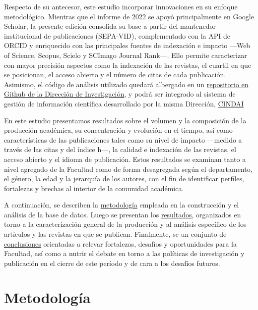 \documentclass[
  a4paper,
  oneside]{scrbook}
\begin{document}
Respecto de su antecesor, este estudio incorporar innovaciones en su
enfoque metodológico. Mientras que el informe de 2022 se apoyó
principalmente en Google Scholar, la presente edición consolida su base
a partir del mantenedor institucional de publicaciones (SEPA-VID),
complementado con la API de ORCID y enriquecido con las principales
fuentes de indexación e impacto ---Web of Science, Scopus, Scielo y
SCImago Journal Rank---. Ello permite caracterizar con mayor precisión
aspectos como la indexación de las revistas, el cuartil en que se
posicionan, el acceso abierto y el número de citas de cada publicación.
Asimismo, el código de análisis utilizado quedará albergado en un
\href{https://github.com/facso-investigacion/publicaciones-facso}{repositorio
en Github de la Dirección de Investigación}, y podrá ser integrado al
sistema de gestión de información científica desarrollado por la misma
Dirección,
\href{https://facso-investigacion.github.io/documentacion-cindai/}{CINDAI}

En este estudio presentamos resultados sobre el volumen y la composición
de la producción académica, su concentración y evolución en el tiempo,
así como características de las publicaciones tales como su nivel de
impacto ---medido a través de las citas y del índice h---, la calidad e
indexación de las revistas, el acceso abierto y el idioma de
publicación. Estos resultados se examinan tanto a nivel agregado de la
Facultad como de forma desagregada según el departamento, el género, la
edad y la jerarquía de los autores, con el fin de identificar perfiles,
fortalezas y brechas al interior de la comunidad académica.

A continuación, se describen la \href{02-metodologia.qmd}{metodología}
empleada en la construcción y el análisis de la base de datos. Luego se
presentan los \href{03-resultados.qmd}{resultados}, organizados en torno
a la caracterización general de la producción y al análisis específico
de los artículos y las revistas en que se publican. Finalmente, se un
conjunto de \href{04-conclusiones.qmd}{conclusiones} orientadas a
relevar fortalezas, desafíos y oportunidades para la Facultad, así como
a nutrir el debate en torno a las políticas de investigación y
publicación en el cierre de este período y de cara a los desafíos
futuros.


\chapter{Metodología}\label{sec-methods}
\end{document}
